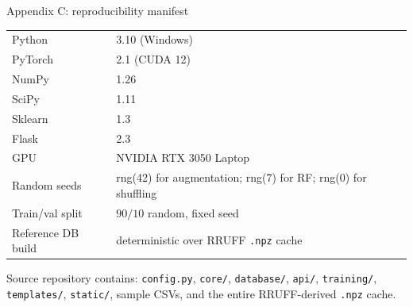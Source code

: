 \documentclass[10pt,aspectratio=169,xcolor=dvipsnames]{beamer}
\newcommand{\code}[1]{\texttt{\small #1}}
\begin{document}
\begin{frame}{Appendix C: reproducibility manifest}
  \begin{table}\centering\footnotesize
    \begin{tabular}{@{}lp{}@{}}
      \toprule
      Python   & 3.10 (Windows) \\
      PyTorch  & 2.1 (CUDA 12) \\
      NumPy    & 1.26 \\
      SciPy    & 1.11 \\
      Sklearn  & 1.3 \\
      Flask    & 2.3 \\
      GPU      & NVIDIA RTX 3050 Laptop \\
      Random seeds & rng(42) for augmentation; rng(7) for RF; rng(0) for shuffling \\
      Train/val split & $90/10$ random, fixed seed \\
      Reference DB build & deterministic over RRUFF \code{.npz} cache \\
      \bottomrule
    \end{tabular}
  \end{table}
  \smallskip
  Source repository contains: \code{config.py}, \code{core/}, \code{database/},
  \code{api/}, \code{training/}, \code{templates/}, \code{static/}, sample CSVs,
  and the entire RRUFF-derived \code{.npz} cache.
\end{frame}
\end{document}
